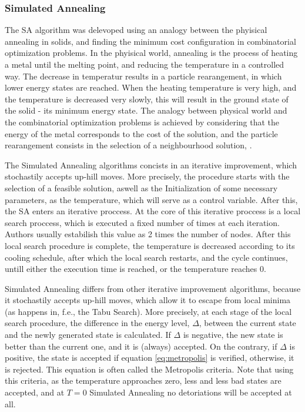 \subsubsection{Simulated Annealing}

The SA algorithm was delevoped using an analogy between the phyisical annealing in solids,
and finding the minimum cost configuration in combinatorial optimization problems.
In the phyisical world, annealing is the process of heating a metal until the melting point, 
and reducing the temperature in a controlled way. The decrease in temperatur results in a particle rearangement,
in which lower energy states are reached. When the heating temperature is very high,
and the temperature is decreased very slowly, this will result in the ground state of the solid - its minimum energy state. 
The analogy between physical world and the combinatorial optimization problems 
is achieved by considering that the energy of the metal corresponds to the cost of the solution,
and the particle rearangement consists in the selection of a neighbourhood solution, \cite{simulated_annealing_1}.

The Simulated Annealing algorithms concists in an iterative improvement, which stochastily accepts up-hill moves.
More precisely, the procedure starts with the selection of a feasible solution, aswell as the Initialization of some necessary 
parameters, as the temperature, which will serve as a control variable. After this, the SA enters an iterative proccess.
At the core of this iterative proccess is a local search proccess, which is executed a fixed number of times at each iteration.
Authors usually estabilish this value as 2 times the number of nodes. After this local search procedure is complete,
the temperature is decreased according to its cooling schedule, after which the local search restarts, and the cycle continues,
untill either the execution time is reached, or the temperature reaches 0.

Simulated Annealing differs from other iterative improvement algorithms, because it stochastily accepts up-hill moves,
which allow it to escape from local minima (as happens in, f.e., the Tabu Search). More precisely, at each stage of the local search procedure,
the difference in the energy level, $\Delta$, between the current state and the newly generated state is calculated.
If $\Delta$ is negative, the new state is better than the current one, and it is (always) accepted.
On the contrary, if $\Delta$ is positive, the state is accepted if equation \ref{eq:metropolis} is verified, otherwise, it is rejected.
This equation is often called the Metropolis criteria.
Note that using this criteria, as the temperature approaches zero, less and less bad states are accepted, and at $T=0$ Simulated Annealing 
no detoriations will be accepted at all.

